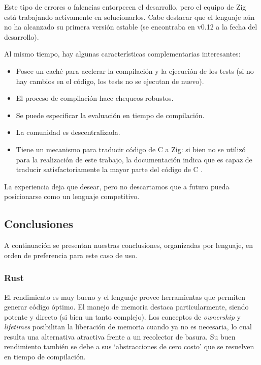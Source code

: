\documentclass[11pt]{article}
\let\Oldsubsection\subsection
\renewcommand{\subsection}{\FloatBarrier\Oldsubsection}
\let\Oldsubsubsection\subsubsection
\renewcommand{\subsubsection}{\FloatBarrier\Oldsubsubsection}
\newcommand{\english}[1]{\textit{#1}}
\begin{document}
Este tipo de errores o falencias entorpecen el desarrollo, pero el equipo de Zig está trabajando activamente en solucionarlos. Cabe destacar que el lenguaje aún no ha alcanzado su primera versión estable (se encontraba en v0.12 a la fecha del desarrollo).

Al mismo tiempo, hay algunas características complementarias interesantes:
\begin{itemize}
    \item Posee un caché para acelerar la compilación y la ejecución de los tests (si no hay cambios en el código, los tests no se ejecutan de nuevo).
    \item El proceso de compilación hace chequeos robustos.
    \item Se puede especificar la evaluación en tiempo de compilación.
    \item La comunidad es descentralizada.
    \item Tiene un mecanismo para traducir código de C a Zig: si bien no se utilizó para la realización de este trabajo, la documentación indica que es capaz de traducir satisfactoriamente la mayor parte del código de C \cite{aes:zig:translate_c}.
\end{itemize}

La experiencia deja que desear, pero no descartamos que a futuro pueda posicionarse como un lenguaje competitivo.

\subsection{Conclusiones}

A continuación se presentan nuestras conclusiones, organizadas por lenguaje, en orden de preferencia para este caso de uso.

\subsubsection{Rust}

El rendimiento es muy bueno y el lenguaje provee herramientas que permiten generar código óptimo. El manejo de memoria destaca particularmente, siendo potente y directo (si bien un tanto complejo). Los conceptos de \english{ownership} y \english{lifetimes} posibilitan la liberación de memoria cuando ya no es necesaria, lo cual resulta una alternativa atractiva frente a un recolector de basura. Su buen rendimiento también se debe a sus `abstracciones de cero costo' que se resuelven en tiempo de compilación.
\end{document}
